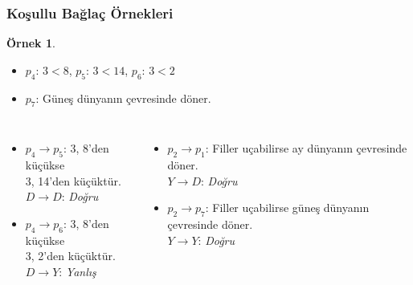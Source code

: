 \documentclass[dvipsnames]{beamer}
\theoremstyle{definition}
\theoremstyle{example}
\newtheorem{ornek}[theorem]{Örnek}
\theoremstyle{plain}
\begin{document}
\begin{frame}
  \frametitle{Koşullu Bağlaç Örnekleri}

  \begin{ornek}
    \begin{itemize}
      \item $p_4$: $3<8$, $p_5$: $3<14$, $p_6$: $3<2$
      \item $p_7$: Güneş dünyanın çevresinde döner.
    \end{itemize}

    \pause
    \begin{columns}[t]
        \begin{itemize}
          \item $p_4 \rightarrow p_5$: 3, 8'den küçükse\\
            3, 14'den küçüktür.\\
            $D \rightarrow D$: \emph{Doğru}
          \pause
          \item $p_4 \rightarrow p_6$: 3, 8'den küçükse\\
            3, 2'den küçüktür.\\
            $D \rightarrow Y$: \emph{Yanlış}
        \end{itemize}

      \pause
        \begin{itemize}
          \item $p_2 \rightarrow p_1$: Filler uçabilirse ay dünyanın çevresinde
            döner.\\
            $Y \rightarrow D$: \emph{Doğru}
          \pause
          \item $p_2 \rightarrow p_7$: Filler uçabilirse güneş dünyanın
            çevresinde döner.\\
            $Y \rightarrow Y$: \emph{Doğru}
        \end{itemize}
    \end{columns}
  \end{ornek}
\end{frame}
\end{document}
